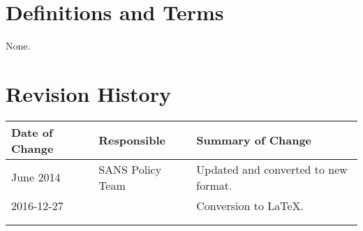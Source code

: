 \section{Definitions and Terms}
None.
\section{Revision History}
\begin{tabular}{|l|l|l|}
\hline{}
	Date of Change&
	Responsible&
	Summary of Change\\
\hline{}
	June 2014&
	SANS Policy Team&
	Updated and converted to new format.\\
\hline{}
	2016-12-27&
	\xio{}&
	Conversion to \LaTeX{}.\\
\hline{}
	 &
	 &
	 \\\hline{}
\end{tabular}
